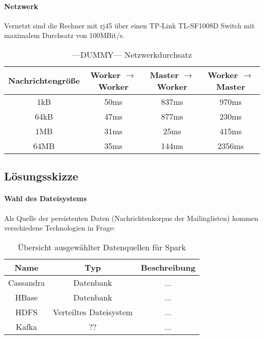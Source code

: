 \paragraph{Netzwerk}
Vernetzt sind die Rechner mit \gls{rj45} über einen TP-Link TL-SF1008D Switch mit maximalem Durchsatz von 100MBit/s.

\begin{table}[ht]
	\caption{---DUMMY--- Netzwerkdurchsatz} %
	\centering %
	\begin{tabular}{c c c c} %
	\hline\hline %
	Nachrichtengröße & Worker $\rightarrow$ Worker & Master $\rightarrow$ Worker & Worker $\rightarrow$ Master \\ [0.5ex] %
	\hline %
	1kB & 50ms & 837ms & 970ms \\ %
	64kB & 47ms & 877ms & 230ms \\
	1MB & 31ms & 25ms & 415ms \\
	64MB & 35ms & 144ms & 2356ms \\ [1ex] 
	\hline %
	\end{tabular}
	\label{table:nonlin} %
\end{table}

\subsection{Lösungsskizze}


\paragraph{Wahl des Dateisystems}

Als Quelle der persistenten Daten (Nachrichtenkorpus der Mailinglisten) kommen verschiedene Technologien in Frage:

\begin{table}[ht]
	\caption{Übersicht ausgewählter Datenquellen für Spark} %
	\centering %
	\begin{tabular}{c c c} %
	\hline\hline %
	Name & Typ & Beschreibung\\ [0.5ex] %
	\hline %
	Cassandra & Datenbank & ...\\ %
	HBase & Datenbank & ...\\
	HDFS & Verteiltes Dateisystem & ...\\
	Kafka & ?? & ...\\
	\hline %
	\end{tabular}
	\label{table:dsources} %
\end{table}

